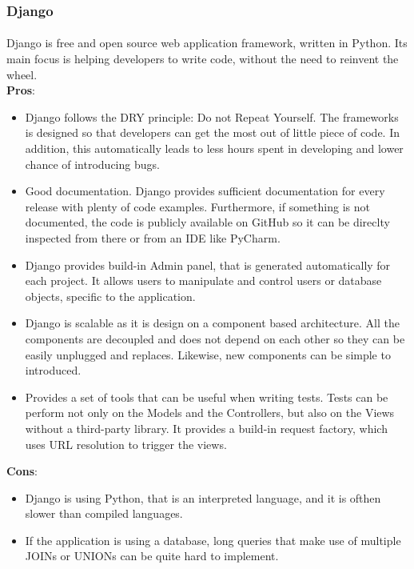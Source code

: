 \documentclass{l4proj}
\begin{document}
\subsubsection{Django}
\paragraph{}
Django is free and open source web application framework, written in Python. Its main focus is helping developers to write code, without the need to reinvent the wheel.
\\ \textbf{Pros}:
\begin{itemize}
	\item Django follows the DRY principle: Do not Repeat Yourself. The frameworks is designed so that developers can get the most out of little piece of code. In addition, this automatically leads to less hours spent in developing and lower chance of introducing bugs.
	\item Good documentation. Django provides sufficient documentation for every release with plenty of code examples. Furthermore, if something is not documented, the code is publicly available on GitHub so 
	it can be direclty inspected from there or from an IDE like PyCharm. 
	\item Django provides build-in Admin panel, that is generated automatically for each project. It allows users to manipulate and control users or database objects, specific to the application.
	\item Django is scalable as it is design on a component based architecture. All the components are decoupled and does not depend on each other so they can be easily unplugged and replaces. Likewise, new components can be simple to introduced. 
	\item Provides a set of tools that can be useful when writing tests. Tests can be perform not only on the Models and the Controllers, but also on the Views without a third-party library. It provides a build-in request factory, which uses URL resolution to trigger the views. 
\end{itemize}

\textbf{Cons}:
\begin{itemize}
	\item Django is using Python, that is an interpreted language, and it is ofthen slower than compiled languages.  
	\item If the application is using a database, long queries that make use of multiple JOINs or UNIONs can be quite hard to implement.  
\end{itemize}
\end{document}
